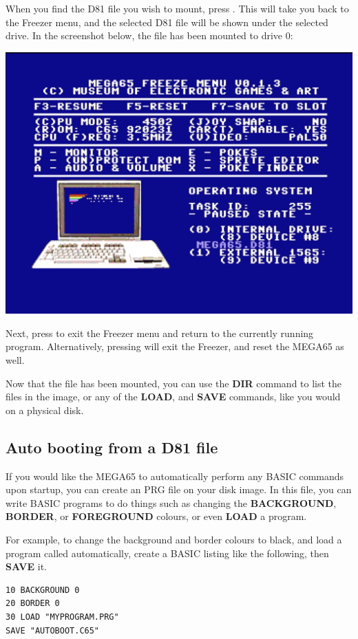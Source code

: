 When you find the D81 file you wish to mount, press .
This will take you back to the Freezer menu, and the selected D81 file will be shown under the selected drive.
In the screenshot below, the   file has been mounted to drive 0:

\begin{center}
\includegraphics[trim= 10mm 20mm 10mm 20mm,clip,width=0.7\linewidth]{images/freezer-chosen-d81.png}
\end{center}

Next, press  to exit the Freezer menu and return to the currently running program. Alternatively,
pressing  will exit the Freezer, and reset the MEGA65 as well.

Now that the file has been mounted, you can use
the {\bf DIR} command to list the files in the image, or any of the {\bf LOAD}, and {\bf SAVE} commands, like you
would on a physical disk.


\subsection{Auto booting from a D81 file}
If you would like the MEGA65 to automatically perform any BASIC commands upon startup, you can create an
 PRG file on your disk image. In this file, you can write BASIC programs to do things such
as changing the {\bf BACKGROUND}, {\bf BORDER}, or {\bf FOREGROUND} colours, or even {\bf LOAD} a program.

For example, to change the background and border colours to black, and load a program called 
automatically, create a BASIC listing like the following, then {\bf SAVE} it.


\begin{tcolorbox}[colback=black,coltext=white]
\verbatimfont{\codefont}
\begin{verbatim}
10 BACKGROUND 0
20 BORDER 0
30 LOAD "MYPROGRAM.PRG"
SAVE "AUTOBOOT.C65"
\end{verbatim}
\end{tcolorbox}
